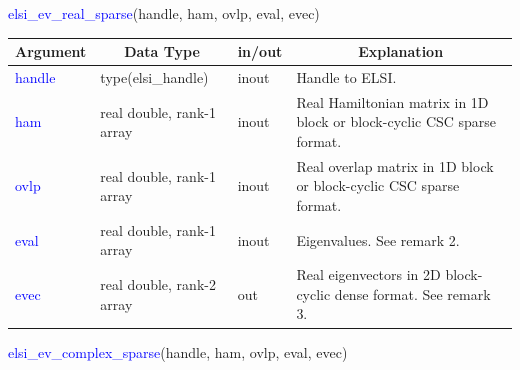 \documentclass{report}
\begin{document}
\bigskip
\begin{labeling}{\hspace{6cm}}
\item [\hspace{0.3cm} \textcolor{blue}{elsi\_ev\_real\_sparse}(handle, ham, ovlp, eval, evec)]
\end{labeling}

\begin{table}[h]
\centering
\begin{tabular}[]{|p{20mm}|p{45mm}|p{15mm}|p{85mm}|}
\hline
\multicolumn{1}{|c|}{\textbf{Argument}} & \multicolumn{1}{c|}{\textbf{Data Type}} & \multicolumn{1}{c|}{\textbf{in/out}} & \multicolumn{1}{c|}{\textbf{Explanation}}\\
\hline
\textcolor{blue}{handle} & type(elsi\_handle)        & inout & Handle to ELSI.\\
\hline
\textcolor{blue}{ham}    & real double, rank-1 array & inout & Real Hamiltonian matrix in 1D block or block-cyclic CSC sparse format.\\
\hline
\textcolor{blue}{ovlp}   & real double, rank-1 array & inout & Real overlap matrix in 1D block or block-cyclic CSC sparse format.\\
\hline
\textcolor{blue}{eval}   & real double, rank-1 array & inout & Eigenvalues.  See remark 2.\\
\hline
\textcolor{blue}{evec}   & real double, rank-2 array & out   & Real eigenvectors in 2D block-cyclic dense format.  See remark 3.\\
\hline
\end{tabular}
\end{table}

\newpage
\begin{labeling}{\hspace{6cm}}
\item [\hspace{0.3cm} \textcolor{blue}{elsi\_ev\_complex\_sparse}(handle, ham, ovlp, eval, evec)]
\end{labeling}
\end{document}
